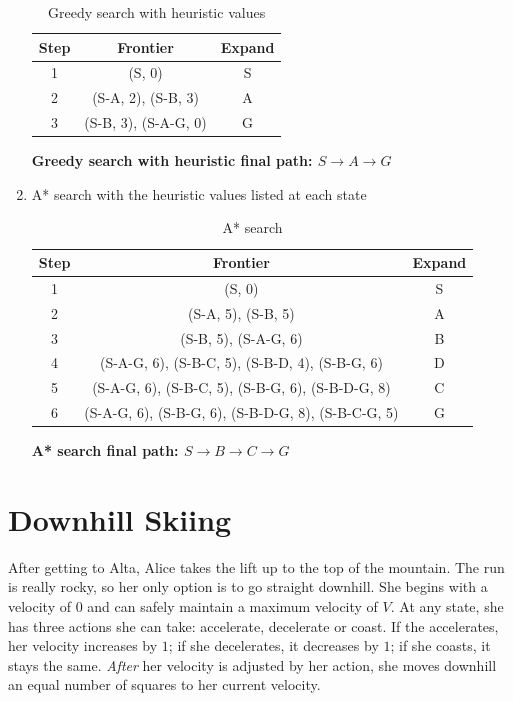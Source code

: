 \documentclass[fleqn]{hermans-hw}
\begin{document}
\begin{enumerate}
\begin{table}[H]
\centering
{\renewcommand{\arraystretch}{1.2}%
\begin{tabular}{| c | c | c |}
\hline
\textbf{Step} & \textbf{Frontier} & \textbf{Expand}\\
\hline
1 & (S, 0) & S\\ \hline
2 & (S-A, 2), (S-B, 3) & A\\ \hline
3 & (S-B, 3), (S-A-G, 0) & G\\ \hline
\end{tabular}}
\caption{Greedy search with heuristic values}
\end{table}

\textbf{Greedy search with heuristic final path: $S \rightarrow A \rightarrow G$}

\item A* search with the heuristic values listed at each state

\begin{table}[H]
\centering
{\renewcommand{\arraystretch}{1.2}%
\begin{tabular}{| c | c | c |}
\hline
\textbf{Step} & \textbf{Frontier} & \textbf{Expand}\\
\hline
1 & (S, 0) & S\\ \hline
2 & (S-A, 5), (S-B, 5) & A\\ \hline
3 & (S-B, 5), (S-A-G, 6) & B\\ \hline
4 & (S-A-G, 6), (S-B-C, 5), (S-B-D, 4), (S-B-G, 6) & D\\ \hline
5 & (S-A-G, 6), (S-B-C, 5), (S-B-G, 6), (S-B-D-G, 8) & C\\ \hline
6 & (S-A-G, 6), (S-B-G, 6), (S-B-D-G, 8), (S-B-C-G, 5) & G\\ \hline
\end{tabular}}
\caption{A* search}
\end{table}

\textbf{A* search final path: $S \rightarrow B \rightarrow C \rightarrow G$}

\end{enumerate}

\newpage
\section{Downhill Skiing}

After getting to Alta, Alice takes the lift up to the top of the
mountain.  The run is really rocky, so her only option is to go
straight downhill.  She begins with a velocity of $0$ and can safely
maintain a maximum velocity of $V$.  At any state, she has three
actions she can take: accelerate, decelerate or coast.  If the
accelerates, her velocity increases by $1$; if she decelerates, it
decreases by $1$; if she coasts, it stays the same.  \emph{After} her
velocity is adjusted by her action, she moves downhill an equal number
of squares to her current velocity.
\end{document}
